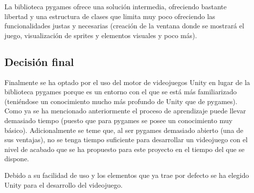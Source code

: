 La biblioteca pygames ofrece una solución intermedia, ofreciendo bastante libertad y una estructura de clases que limita muy poco ofreciendo las funcionalidades justas y necesarias (creación de la ventana donde se mostrará el juego, visualización de sprites y elementos visuales y poco más).

\subsection{Decisión final}
Finalmente se ha optado por el uso del motor de videojuegos Unity en lugar de la biblioteca pygames porque es un entorno con el que se está más familiarizado (teniéndose un conocimiento mucho más profundo de Unity que de pygames). Como ya se ha mencionado anteriormente el proceso de aprendizaje puede llevar demasiado tiempo (puesto que para pygames se posee un conocimiento muy básico). Adicionalmente se teme que, al ser pygames demasiado abierto (una de sus ventajas), no se tenga tiempo suficiente para desarrollar un videojuego con el nivel de acabado que se ha propuesto para este proyecto en el tiempo del que se dispone.

Debido a su facilidad de uso y los elementos que ya trae por defecto se ha elegido Unity para el desarrollo del videojuego.

